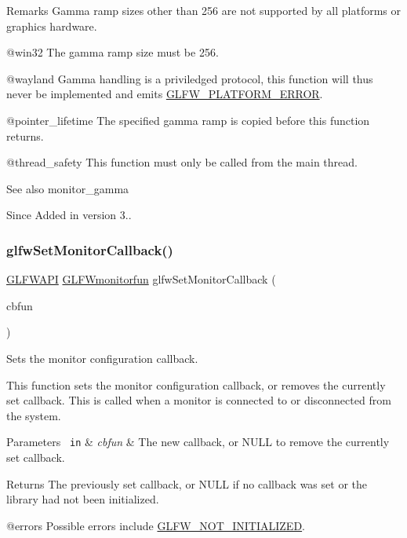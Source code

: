 \begin{DoxyRemark}{Remarks}
Gamma ramp sizes other than 256 are not supported by all platforms or graphics hardware.

@win32 The gamma ramp size must be 256.

@wayland Gamma handling is a priviledged protocol, this function will thus never be implemented and emits \mbox{\hyperlink{group__errors_gad44162d78100ea5e87cdd38426b8c7a1}{G\+L\+F\+W\+\_\+\+P\+L\+A\+T\+F\+O\+R\+M\+\_\+\+E\+R\+R\+OR}}.
\end{DoxyRemark}
@pointer\+\_\+lifetime The specified gamma ramp is copied before this function returns.

@thread\+\_\+safety This function must only be called from the main thread.

\begin{DoxySeeAlso}{See also}
monitor\+\_\+gamma
\end{DoxySeeAlso}
\begin{DoxySince}{Since}
Added in version 3.. 
\end{DoxySince}
\mbox{\label{group__monitor_gacfa9978e57c73670577d530df23bf275}} 
\subsubsection{\texorpdfstring{glfwSetMonitorCallback()}{glfwSetMonitorCallback()}}
{\footnotesize\ttfamily \mbox{\hyperlink{glfw3_8h_a56da5036b2cc259351ae22fd6439bb47}{G\+L\+F\+W\+A\+PI}} \mbox{\hyperlink{group__monitor_ga8a7ee579a66720f24d656526f3e44c63}{G\+L\+F\+Wmonitorfun}} glfw\+Set\+Monitor\+Callback (\begin{DoxyParamCaption}\item[{\mbox{\hyperlink{group__monitor_ga8a7ee579a66720f24d656526f3e44c63}{G\+L\+F\+Wmonitorfun}}}]{cbfun }\end{DoxyParamCaption})}



Sets the monitor configuration callback. 

This function sets the monitor configuration callback, or removes the currently set callback. This is called when a monitor is connected to or disconnected from the system.


\begin{DoxyParams}[1]{Parameters}
\mbox{\texttt{ in}}  & {\em cbfun} & The new callback, or {\ttfamily N\+U\+LL} to remove the currently set callback. \\
\hline
\end{DoxyParams}
\begin{DoxyReturn}{Returns}
The previously set callback, or {\ttfamily N\+U\+LL} if no callback was set or the library had not been initialized.
\end{DoxyReturn}
@errors Possible errors include \mbox{\hyperlink{group__errors_ga2374ee02c177f12e1fa76ff3ed15e14a}{G\+L\+F\+W\+\_\+\+N\+O\+T\+\_\+\+I\+N\+I\+T\+I\+A\+L\+I\+Z\+ED}}.

